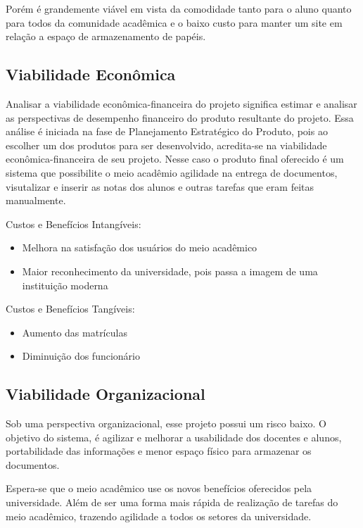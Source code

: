  Porém é grandemente viável em vista da comodidade tanto para o
aluno quanto para todos da comunidade acadêmica e o baixo custo para manter um site em relação
a espaço de armazenamento de papéis.


 \subsection{Viabilidade Econômica}

Analisar a viabilidade econômica-financeira do projeto significa estimar e
analisar as perspectivas de desempenho financeiro do produto resultante do
projeto. Essa análise é iniciada na fase de Planejamento Estratégico do
Produto, pois ao escolher um dos produtos para ser desenvolvido, acredita-se
na viabilidade econômica-financeira de seu projeto. Nesse caso o produto final
oferecido é um sistema que possibilite o meio acadêmio agilidade na entrega de documentos,
visutalizar e inserir as notas dos alunos e outras tarefas que eram feitas manualmente.

\begin{flushleft}
Custos e Benefícios Intangíveis:
\end{flushleft}
 \begin{itemize}
  \item Melhora na satisfação dos usuários do meio acadêmico
  \item Maior reconhecimento da universidade, pois passa a imagem de uma instituição moderna
 \end{itemize}

 \begin{flushleft}
Custos e Benefícios Tangíveis:
\end{flushleft}
 \begin{itemize}
  \item Aumento das matrículas
  \item Diminuição dos funcionário
 \end{itemize}

  \subsection{Viabilidade Organizacional}

Sob uma perspectiva organizacional, esse projeto possui um risco baixo.
O objetivo do sistema, é agilizar e melhorar a usabilidade dos docentes e
alunos, portabilidade das informações e menor espaço físico para armazenar os documentos.

Espera-se que o meio acadêmico use os novos benefícios oferecidos
pela universidade. Além de ser uma forma mais rápida de realização de tarefas do meio acadêmico,
trazendo agilidade a todos os setores da universidade.


